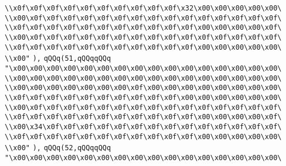 \verb|\\x0f\x0f\x0f\x0f\x0f\x0f\x0f\x0f\x0f\x0f\x32\x00\x00\x00\x00\x00\|\newline
\verb|\\x00\x0f\x0f\x0f\x0f\x0f\x0f\x0f\x0f\x0f\x0f\x0f\x0f\x0f\x0f\x0f\|\newline
\verb|\\x0f\x0f\x0f\x0f\x0f\x0f\x0f\x0f\x0f\x0f\x0f\x00\x00\x00\x00\x0f\|\newline
\verb|\\x00\x0f\x0f\x0f\x0f\x0f\x0f\x0f\x0f\x0f\x0f\x0f\x0f\x0f\x0f\x0f\|\newline
\verb|\\x0f\x0f\x0f\x0f\x0f\x0f\x0f\x0f\x0f\x0f\x0f\x00\x00\x00\x00\x00\|\newline
\verb|\\x00"|\newline
\verb|),|\newline
\verb|qQQq(51,qQQqqQQq|\newline
\verb|"\x00\x00\x00\x00\x00\x00\x00\x00\x00\x00\x00\x00\x00\x00\x00\x00\|\newline
\verb|\\x00\x00\x00\x00\x00\x00\x00\x00\x00\x00\x00\x00\x00\x00\x00\x00\|\newline
\verb|\\x00\x00\x00\x00\x00\x00\x00\x0f\x00\x00\x00\x00\x00\x00\x00\x00\|\newline
\verb|\\x0f\x0f\x0f\x0f\x0f\x0f\x0f\x0f\x0f\x0f\x00\x00\x00\x00\x00\x00\|\newline
\verb|\\x00\x0f\x0f\x0f\x0f\x0f\x0f\x0f\x0f\x0f\x0f\x0f\x0f\x0f\x0f\x0f\|\newline
\verb|\\x0f\x0f\x0f\x0f\x0f\x0f\x0f\x0f\x0f\x0f\x0f\x00\x00\x00\x00\x0f\|\newline
\verb|\\x00\x34\x0f\x0f\x0f\x0f\x0f\x0f\x0f\x0f\x0f\x0f\x0f\x0f\x0f\x0f\|\newline
\verb|\\x0f\x0f\x0f\x0f\x0f\x0f\x0f\x0f\x0f\x0f\x0f\x00\x00\x00\x00\x00\|\newline
\verb|\\x00"|\newline
\verb|),|\newline
\verb|qQQq(52,qQQqqQQq|\newline
\verb|"\x00\x00\x00\x00\x00\x00\x00\x00\x00\x00\x00\x00\x00\x00\x00\x00\|\newline
